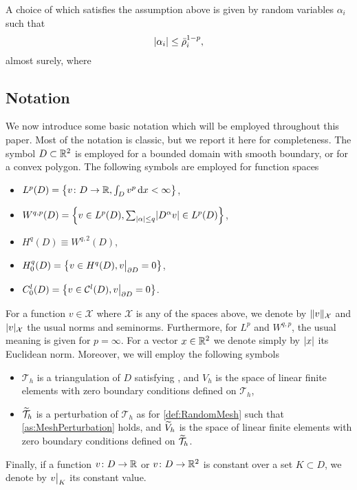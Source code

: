\documentclass[10pt]{article}
\begin{document}
A choice of which satisfies the assumption above is given by random variables $\alpha_i$ such that
\begin{equation}
	\lvert\alpha_i\rvert \leq \bar \rho_i^{1-p},
\end{equation}
almost surely, where 

\subsection{Notation}

We now introduce some basic notation which will be employed throughout this paper. Most of the notation is classic, but we report it here for completeness. The symbol $D \subset \mathbb{R}^2$ is employed for a bounded domain with smooth boundary, or for a convex polygon. The following symbols are employed for function spaces
\begin{itemize}
	\item $L^p(D) = \left\{v\colon D \to \mathbb{R}, \int_D v^p \, \mathrm{d} x< \infty \right\}$,
	\item $W^{q, p}(D) = \left\{v \in L^p(D), \sum_{\lvert\alpha\rvert\leq q} \lvert D^{\alpha} v\rvert \in L^p(D) \right\}$,
	\item $H^q(D) \equiv W^{q,2}(D)$,
	\item $H^q_0(D) = \left\{v \in H^q(D), v\bigr\rvert_{\partial D} = 0\right\}$,
	\item $C^l_0(D) = \left\{v \in \mathcal C^l(D), v\bigr\rvert_{\partial D} = 0\right\}$.
\end{itemize}
For a function $v \in \mathcal X$ where $\mathcal X$ is any of the spaces above, we denote by $\lVert v\rVert_{\mathcal X}$ and $\lvert v\rvert_{\mathcal X}$ the usual norms and seminorms. Furthermore, for $L^p$ and $W^{q,p}$, the usual meaning is given for $p = \infty$. For a vector $x \in \mathbb{R}^2$ we denote simply by $\lvert x\rvert$ its Euclidean norm. Moreover, we will employ the following symbols
\begin{itemize}
	\item $\mathcal T_h$ is a triangulation of $D$ satisfying , and $V_h$ is the space of linear finite elements with zero boundary conditions defined on $\mathcal T_h$,
	\item $\widetilde{\mathcal T}_h$ is a perturbation of $\mathcal T_h$ as for \cref{def:RandomMesh} such that \cref{as:MeshPerturbation} holds, and $\widetilde V_h$ is the space of linear finite elements with zero boundary conditions defined on $\widetilde{\mathcal T}_h$.
\end{itemize}
Finally, if a function $v \colon D \to \mathbb{R}$ or $v \colon D \to \mathbb{R}^2$ is constant over a set $K \subset D$, we denote by $v\bigr\rvert_{K}$ its constant value.
\end{document}
